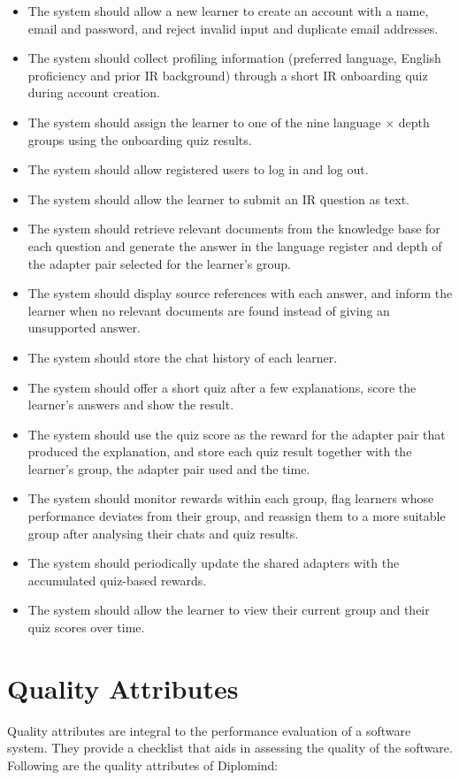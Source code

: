 \documentclass{FastFyp}
\begin{document}
\begin{itemize}
    \item The system should allow a new learner to create an account with a name, email and password, and reject invalid input and duplicate email addresses.
    \item The system should collect profiling information (preferred language, English proficiency and prior IR background) through a short IR onboarding quiz during account creation.
    \item The system should assign the learner to one of the nine language $\times$ depth groups using the onboarding quiz results.
    \item The system should allow registered users to log in and log out.
    \item The system should allow the learner to submit an IR question as text.
    \item The system should retrieve relevant documents from the knowledge base for each question and generate the answer in the language register and depth of the adapter pair selected for the learner's group.
    \item The system should display source references with each answer, and inform the learner when no relevant documents are found instead of giving an unsupported answer.
    \item The system should store the chat history of each learner.
    \item The system should offer a short quiz after a few explanations, score the learner's answers and show the result.
    \item The system should use the quiz score as the reward for the adapter pair that produced the explanation, and store each quiz result together with the learner's group, the adapter pair used and the time.
    \item The system should monitor rewards within each group, flag learners whose performance deviates from their group, and reassign them to a more suitable group after analysing their chats and quiz results.
    \item The system should periodically update the shared adapters with the accumulated quiz-based rewards.
    \item The system should allow the learner to view their current group and their quiz scores over time.
\end{itemize}

\section{Quality Attributes}
Quality attributes are integral to the performance evaluation of a software system. They provide a checklist that aids in assessing the quality of the software. Following are the quality attributes of Diplomind:
\end{document}
